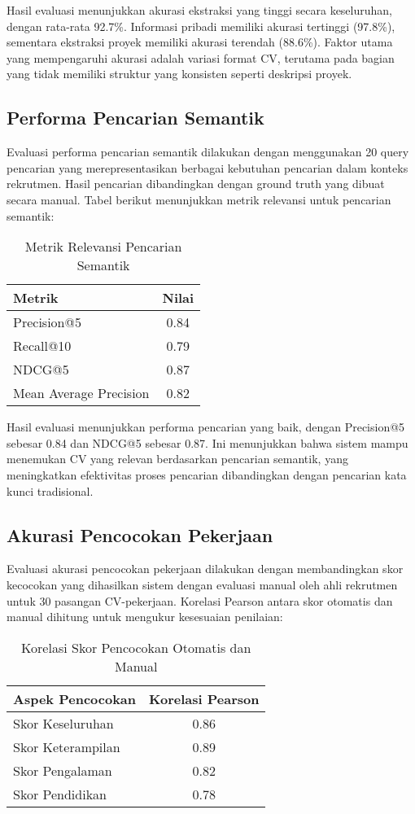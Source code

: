 Hasil evaluasi menunjukkan akurasi ekstraksi yang tinggi secara keseluruhan, dengan rata-rata 92.7\%. Informasi pribadi memiliki akurasi tertinggi (97.8\%), sementara ekstraksi proyek memiliki akurasi terendah (88.6\%). Faktor utama yang mempengaruhi akurasi adalah variasi format CV, terutama pada bagian yang tidak memiliki struktur yang konsisten seperti deskripsi proyek.

\subsection{Performa Pencarian Semantik}
Evaluasi performa pencarian semantik dilakukan dengan menggunakan 20 query pencarian yang merepresentasikan berbagai kebutuhan pencarian dalam konteks rekrutmen. Hasil pencarian dibandingkan dengan ground truth yang dibuat secara manual. Tabel berikut menunjukkan metrik relevansi untuk pencarian semantik:

\begin{table}[h]
\centering
\begin{tabular}{|l|c|}
\hline
\textbf{Metrik} & \textbf{Nilai} \\
\hline
Precision@5 & 0.84 \\
Recall@10 & 0.79 \\
NDCG@5 & 0.87 \\
Mean Average Precision & 0.82 \\
\hline
\end{tabular}
\caption{Metrik Relevansi Pencarian Semantik}
\end{table}

Hasil evaluasi menunjukkan performa pencarian yang baik, dengan Precision@5 sebesar 0.84 dan NDCG@5 sebesar 0.87. Ini menunjukkan bahwa sistem mampu menemukan CV yang relevan berdasarkan pencarian semantik, yang meningkatkan efektivitas proses pencarian dibandingkan dengan pencarian kata kunci tradisional.

\subsection{Akurasi Pencocokan Pekerjaan}
Evaluasi akurasi pencocokan pekerjaan dilakukan dengan membandingkan skor kecocokan yang dihasilkan sistem dengan evaluasi manual oleh ahli rekrutmen untuk 30 pasangan CV-pekerjaan. Korelasi Pearson antara skor otomatis dan manual dihitung untuk mengukur kesesuaian penilaian:

\begin{table}[h]
\centering
\begin{tabular}{|l|c|}
\hline
\textbf{Aspek Pencocokan} & \textbf{Korelasi Pearson} \\
\hline
Skor Keseluruhan & 0.86 \\
Skor Keterampilan & 0.89 \\
Skor Pengalaman & 0.82 \\
Skor Pendidikan & 0.78 \\
\hline
\end{tabular}
\caption{Korelasi Skor Pencocokan Otomatis dan Manual}
\end{table}

